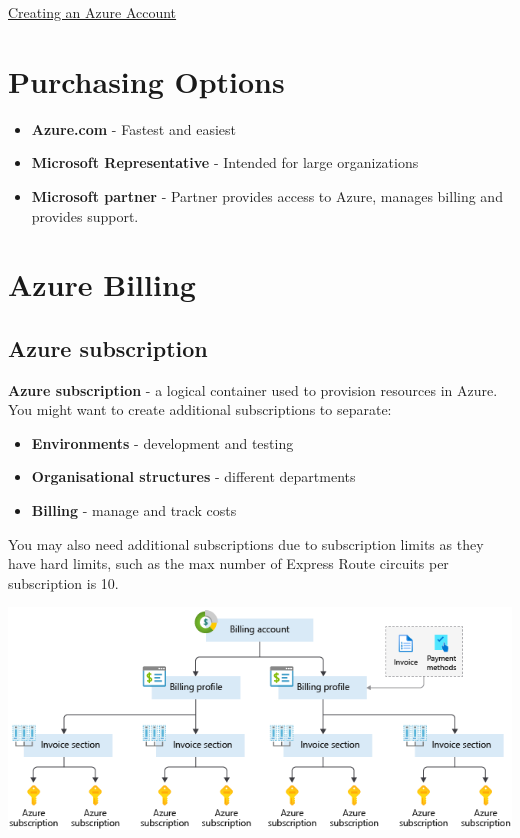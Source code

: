 \documentclass{article}[18pt]
\begin{document}
\begin{center}
\underline{\huge Creating an Azure Account}
\end{center}
\section{Purchasing Options}
\begin{itemize}
	\item \textbf{Azure.com} - Fastest and easiest
	\item \textbf{Microsoft Representative} - Intended for large organizations
	\item \textbf{Microsoft partner} - Partner provides access to Azure, manages billing and provides support.
\end{itemize}
\section{Azure Billing}
\subsection{Azure subscription}
\textbf{Azure subscription} - a logical container used to provision resources in Azure.\\
You might want to create additional subscriptions to separate:
\begin{itemize}
	\item \textbf{Environments} - development and testing
	\item \textbf{Organisational structures} - different departments
	\item \textbf{Billing} - manage and track costs
\end{itemize}
You may also need additional subscriptions due to subscription limits as they have hard limits, such as the max number of Express Route circuits per subscription is 10.
\begin{center}
	\includegraphics[width=15cm]{4-billing-structure-overview}
\end{center}
\end{document}

